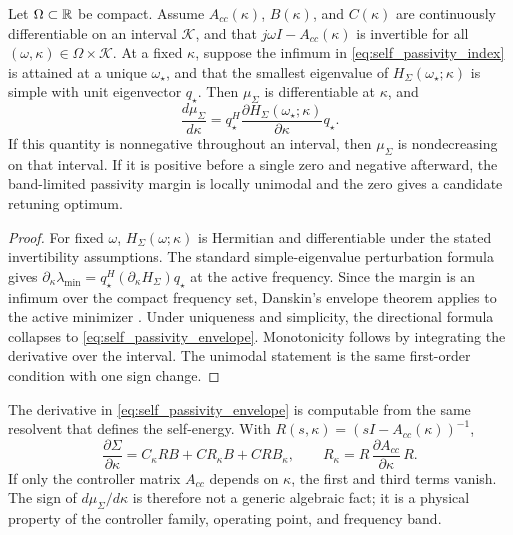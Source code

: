 \begin{theorem}
\label{thm:self_passivity_retuning}
Let \(\Omega\subset\mathbb{R}\) be compact. Assume \(A_{cc}(\kappa)\), \(B(\kappa)\),
and \(C(\kappa)\) are continuously differentiable on an interval
\(\mathcal K\), and that \(j\omega I-A_{cc}(\kappa)\) is invertible for all
\((\omega,\kappa)\in\Omega\times\mathcal K\). At a fixed \(\kappa\), suppose
the infimum in \eqref{eq:self_passivity_index} is attained at a unique
\(\omega_\star\), and that the smallest eigenvalue of
\(H_\Sigma(\omega_\star;\kappa)\) is simple with unit eigenvector \(q_\star\).
Then \(\mu_\Sigma\) is differentiable at \(\kappa\), and
\begin{equation}
  \frac{d\mu_\Sigma}{d\kappa}
  =
  q_\star^H
  \frac{\partial H_\Sigma(\omega_\star;\kappa)}{\partial\kappa}
  q_\star .
  \label{eq:self_passivity_envelope}
\end{equation}
If this quantity is nonnegative throughout an interval, then
\(\mu_\Sigma\) is nondecreasing on that interval. If it is positive before a
single zero and negative afterward, the band-limited passivity margin is locally
unimodal and the zero gives a candidate retuning optimum.
\end{theorem}

\begin{proof}
For fixed \(\omega\), \(H_\Sigma(\omega;\kappa)\) is Hermitian and differentiable
under the stated invertibility assumptions. The standard simple-eigenvalue
perturbation formula gives
\(\partial_\kappa\lambda_{\min}=q_\star^H(\partial_\kappa H_\Sigma)q_\star\)
at the active frequency. Since the margin is an infimum over the compact
frequency set, Danskin's envelope theorem applies to the active minimizer
\cite{danskin1967maxmin,rockafellar1998variational}. Under uniqueness and
simplicity, the directional formula collapses to
\eqref{eq:self_passivity_envelope}. Monotonicity follows by integrating the
derivative over the interval. The unimodal statement is the same first-order
condition with one sign change.
\end{proof}

The derivative in \eqref{eq:self_passivity_envelope} is computable from the same
resolvent that defines the self-energy. With \(R(s,\kappa)=(sI-A_{cc}(\kappa))^{-1}\),
\begin{equation}
  \frac{\partial\Sigma}{\partial\kappa}
  =
  C_\kappa R B
  +
  C R_\kappa B
  +
  C R B_\kappa,\qquad
  R_\kappa
  =
  R\,\frac{\partial A_{cc}}{\partial\kappa}\,R.
  \label{eq:self_sigma_kappa_derivative}
\end{equation}
If only the controller matrix \(A_{cc}\) depends on \(\kappa\), the first and
third terms vanish. The sign of \(d\mu_\Sigma/d\kappa\) is therefore not a
generic algebraic fact; it is a physical property of the controller family,
operating point, and frequency band.

